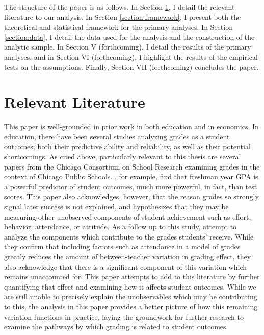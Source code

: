 \documentclass{article}\usepackage{knitr}
\begin{document}
The structure of the paper is as follows. In Section \ref{section:lit}, I detail the relevant literature to our analysis. In Section \ref{section:framework}, I present both the theoretical and statistical framework for the primary analyses. In Section \ref{section:data}, I detail the data used for the analysis and the construction of the analytic sample. In Section V (forthcoming), I detail the results of the primary analyses, and in Section VI (forthcoming), I highlight the results of the empirical tests on the assumptions. Finally, Section VII (forthcoming) concludes the paper. 




\doublespacing
\section{Relevant Literature}
\label{section:lit}

This paper is well-grounded in prior work in both education and in economics. In education, there have been several studies analyzing grades as a student outcomes; both their predictive ability and reliability, as well as their potential shortcomings. As cited above, particularly relevant to this thesis are several papers from the Chicago Consortium on School Research examining grades in the context of Chicago Public Schools. \citet{eastonPredictivePowerNinthGrade2017}, for example, find that freshman year GPA is a powerful predictor of student outcomes, much more powerful, in fact, than test scores. This paper also acknowledges, however, that the reason grades so strongly signal later success is not explained, and hypothesizes that they may be measuring other unobserved components of student achievement such as effort, behavior, attendance, or attitude. As a follow up to this study, \citet{allensworthWhyStudentsGet2018} attempt to analyze the components which contribute to the grades students' receive. While they confirm that including factors such as attendance in a model of grades greatly reduces the amount of between-teacher variation in grading effect, they also acknowledge that there is a significant component of this variation which remains unaccounted for. This paper attempts to add to this literature by further quantifying that effect and examining how it affects student outcomes. While we are still unable to precisely explain the unobservables which may be contributing to this, the analysis in this paper provides a better picture of how this remaining variation functions in practice, laying the groundwork for further research to examine the pathways by which grading is related to student outcomes. 
\end{document}
